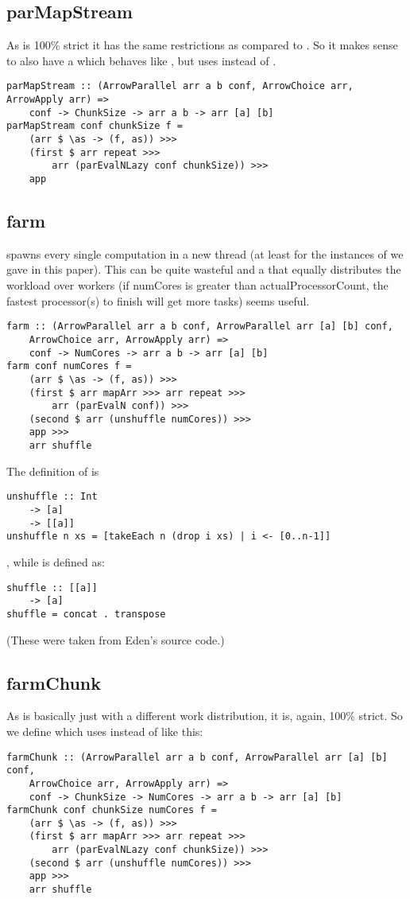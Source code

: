 \subsection{parMapStream}
As  is 100\% strict it has the same restrictions as  compared to . So it makes sense to also have a  which behaves like , but uses  instead of .
\begin{lstlisting}[frame=htrbl]
parMapStream :: (ArrowParallel arr a b conf, ArrowChoice arr, ArrowApply arr) =>
	conf -> ChunkSize -> arr a b -> arr [a] [b]
parMapStream conf chunkSize f =
	(arr $ \as -> (f, as)) >>>
	(first $ arr repeat >>>
		arr (parEvalNLazy conf chunkSize)) >>>
	app
\end{lstlisting}

\subsection{farm}
 spawns every single computation in a new thread (at least for the instances of  we gave in this paper). This can be quite wasteful and a  that equally distributes the workload over  workers (if numCores is greater than actualProcessorCount, the fastest processor(s) to finish will get more tasks) seems useful.
\begin{lstlisting}[frame=htrbl]
farm :: (ArrowParallel arr a b conf, ArrowParallel arr [a] [b] conf,
	ArrowChoice arr, ArrowApply arr) =>
	conf -> NumCores -> arr a b -> arr [a] [b]
farm conf numCores f =
	(arr $ \as -> (f, as)) >>>
	(first $ arr mapArr >>> arr repeat >>>
		arr (parEvalN conf)) >>>
	(second $ arr (unshuffle numCores)) >>>
	app >>>
	arr shuffle
\end{lstlisting}
The definition of  is
\begin{lstlisting}[frame=htrbl]
unshuffle :: Int
	-> [a]
	-> [[a]]
unshuffle n xs = [takeEach n (drop i xs) | i <- [0..n-1]]
\end{lstlisting}
, while  is defined as:
\begin{lstlisting}[frame=htrbl]
shuffle :: [[a]]
	-> [a]
shuffle = concat . transpose
\end{lstlisting}
(These were taken from Eden's source code.)

\subsection{farmChunk}
As  is basically just  with a different work distribution, it is, again, 100\% strict. So we define  which uses  instead of  like this:
\begin{lstlisting}[frame=htrbl]
farmChunk :: (ArrowParallel arr a b conf, ArrowParallel arr [a] [b] conf,
	ArrowChoice arr, ArrowApply arr) =>
	conf -> ChunkSize -> NumCores -> arr a b -> arr [a] [b]
farmChunk conf chunkSize numCores f =
	(arr $ \as -> (f, as)) >>>
	(first $ arr mapArr >>> arr repeat >>>
		arr (parEvalNLazy conf chunkSize)) >>>
	(second $ arr (unshuffle numCores)) >>>
	app >>>
	arr shuffle
\end{lstlisting}